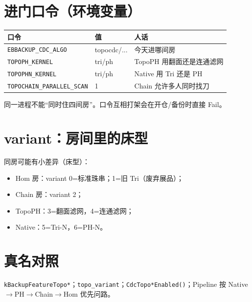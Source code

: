 \section{进门口令（环境变量）}

\begin{center}
\begin{tabular}{@{}llp{5.5cm}@{}}
\toprule
口令 & 值 & 人话 \\
\midrule
\texttt{EBBACKUP\_CDC\_ALGO} & topocdc/... & 今天进哪间房 \\
\texttt{TOPOPH\_KERNEL} & tri/ph & TopoPH 用翻面还是连通滤网 \\
\texttt{TOPOPHN\_KERNEL} & tri/ph & Native 用 Tri 还是 PH \\
\texttt{TOPOCHAIN\_PARALLEL\_SCAN} & 1 & Chain 允许多人同时找刀 \\
\bottomrule
\end{tabular}
\end{center}

\begin{pitfall}[互斥]
同一进程不能``同时住四间房''。口令互相打架会在开仓/备份时直接 Fail。
\end{pitfall}

\section{variant：房间里的床型}

同房可能有小差异（床型）：
\begin{itemize}[nosep]
  \item Hom 房：variant 0=标准珠串；1=旧 Tri（废弃展品）；
  \item Chain 房：variant 2；
  \item TopoPH：3=翻面滤网，4=连通滤网；
  \item Native：5=Tri-N，6=PH-N。
\end{itemize}

\section{真名对照}

\texttt{kBackupFeatureTopo*}；\texttt{topo\_variant}；\texttt{CdcTopo*Enabled()}；Pipeline 按 Native$\to$PH$\to$Chain$\to$Hom 优先问路。
